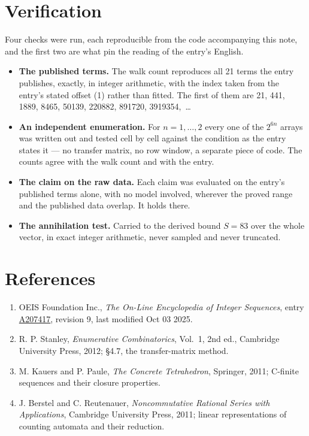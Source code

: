 \documentclass[11pt]{article}
\theoremstyle{definition}
\begin{document}
\section{Verification}

Four checks were run, each reproducible from the code accompanying this note, and the first two are what pin the reading of the entry's English.

\begin{itemize}

\item {\bfseries The published terms.} The walk count reproduces all 21 terms the entry publishes, exactly, in integer arithmetic, with the index taken from the entry's stated offset (1) rather than fitted. The first of them are 21, 441, 1889, 8465, 50139, 220882, 891720, 3919354,~\dots

\item {\bfseries An independent enumeration.} For $n = 1,\dots,2$ every one of the $2^{6n}$ arrays was written out and tested cell by cell against the condition as the entry states it --- no transfer matrix, no row window, a separate piece of code. The counts agree with the walk count and with the entry.

\item {\bfseries The claim on the raw data.} Each claim was evaluated on the entry's published terms alone, with no model involved, wherever the proved range and the published data overlap. It holds there.

\item {\bfseries The annihilation test.} Carried to the derived bound $S = 83$ over the whole vector, in exact integer arithmetic, never sampled and never truncated.

\end{itemize}

\section{References}

\begin{enumerate}

\item OEIS Foundation Inc., \emph{The On-Line Encyclopedia of Integer Sequences}, entry \href{https://oeis.org/A207417}{A207417}, revision 9, last modified Oct 03 2025.

\item R. P. Stanley, \emph{Enumerative Combinatorics}, Vol.~1, 2nd ed., Cambridge University Press, 2012; \S4.7, the transfer-matrix method.

\item M. Kauers and P. Paule, \emph{The Concrete Tetrahedron}, Springer, 2011; C-finite sequences and their closure properties.

\item J. Berstel and C. Reutenauer, \emph{Noncommutative Rational Series with Applications}, Cambridge University Press, 2011; linear representations of counting automata and their reduction.

\end{enumerate}
\end{document}
